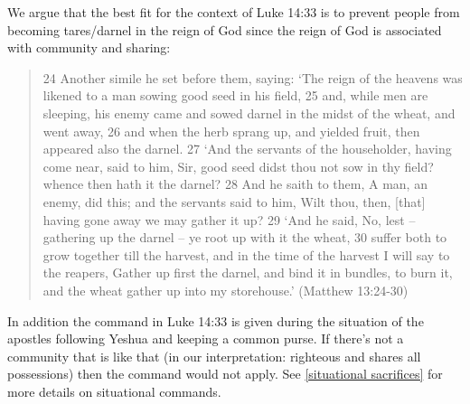 \documentclass[11pt]{article}
\begin{document}
\noindent We argue that the best fit for the context of Luke 14:33 is to prevent people from becoming tares/darnel in the reign of God since the reign of God is associated with community and sharing:
 \begin{quote}
24 Another simile he set before them, saying: `The reign of the heavens was likened to a man sowing good seed in his field,
25 and, while men are sleeping, his enemy came and sowed darnel in the midst of the wheat, and went away,
26 and when the herb sprang up, and yielded fruit, then appeared also the darnel.
27 `And the servants of the householder, having come near, said to him, Sir, good seed didst thou not sow in thy field? whence then hath it the darnel?
28 And he saith to them, A man, an enemy, did this; and the servants said to him, Wilt thou, then, [that] having gone away we may gather it up?
29 `And he said, No, lest -- gathering up the darnel -- ye root up with it the wheat,
30 suffer both to grow together till the harvest, and in the time of the harvest I will say to the reapers, Gather up first the darnel, and bind it in bundles, to burn it, and the wheat gather up into my storehouse.' (Matthew 13:24-30)
 \end{quote}
In addition the command in Luke 14:33 is given during the situation of the apostles following Yeshua and keeping a common purse. If there's not a community that is like that (in our interpretation: righteous and shares all possessions) then the command would not apply. See \ref{situational sacrifices} for more details on situational commands.
\end{document}
